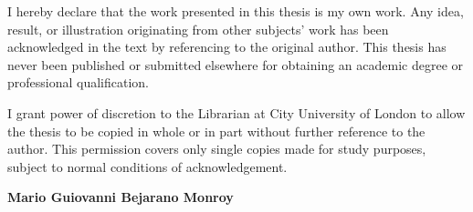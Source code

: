 
\begin{acknowledgements}      


I hereby declare that the work presented in this thesis is my own work. Any idea, result, or illustration originating from other subjects’ work has been acknowledged in the text by referencing to the original author. This thesis has never been published or submitted elsewhere for obtaining an academic degree or professional qualification. 

I grant power of discretion to the Librarian at City University of London to allow the thesis to be copied in whole or in part without further reference to the author. This permission covers only single copies made for study purposes, subject to normal conditions of acknowledgement.

\textbf{Mario Guiovanni Bejarano Monroy}

\end{acknowledgements}
